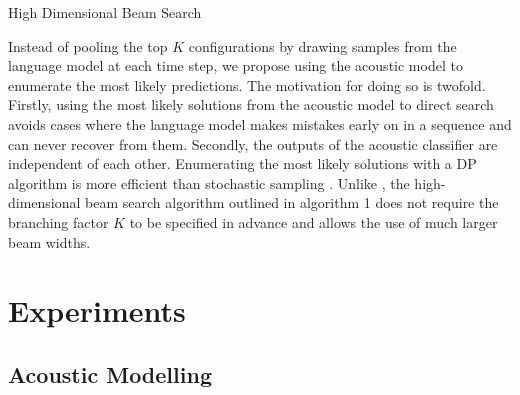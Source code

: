 \documentclass{article}
\DeclareMathOperator*{\argmax}{\arg\!\max}
\begin{document}


\begin{algorithm}
\caption{High Dimensional Beam Search}
\begin{algorithmic}
		\EndFor
	\EndWhile
\EndFor
{}
\end{algorithmic}
\end{algorithm}


Instead of pooling the top $K$ configurations by drawing samples from the language model at each time step, we propose using the acoustic model to enumerate the most likely predictions. The motivation for doing so is twofold. Firstly, using the most likely solutions from the acoustic model to direct search avoids cases where the language model makes mistakes early on in a sequence and can never recover from them. Secondly, the outputs of the acoustic classifier are independent of each other. Enumerating the most likely solutions with a DP algorithm is more efficient than stochastic sampling \cite{boulanger2013high}. Unlike \cite{boulanger2013high}, the high-dimensional beam search algorithm outlined in algorithm 1 does not require the branching factor $K$ to be specified in advance and allows the use of much larger beam widths.
%
%

\section{Experiments}
\subsection{Acoustic Modelling}
\end{document}

